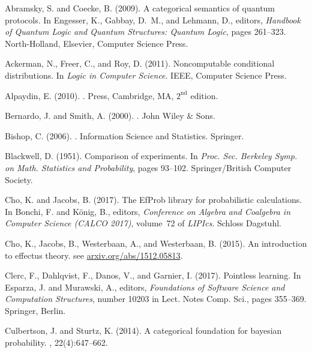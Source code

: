 \documentclass{mscs}
\begin{document}
\begin{thebibliography}{}

Abramsky, S. and Coecke, B. (2009).
\newblock A categorical semantics of quantum protocols.
\newblock In Engesser, K., Gabbay, D.~M., and Lehmann, D., editors, {\em
  Handbook of Quantum Logic and Quantum Structures: Quantum Logic}, pages
  261--323. North-Holland, Elsevier, Computer Science Press.

Ackerman, N., Freer, C., and Roy, D. (2011).
\newblock Noncomputable conditional distributions.
\newblock In {\em Logic in Computer Science}. IEEE, Computer Science Press.

Alpaydin, E. (2010).
.
 Press, Cambridge, MA, $2^{\textrm{nd}}$ edition.

Bernardo, J. and Smith, A. (2000).
.
\newblock John Wiley \& Sons.

Bishop, C. (2006).
.
\newblock Information Science and Statistics. Springer.

Blackwell, D. (1951).
\newblock Comparison of experiments.
\newblock In {\em Proc. Sec. Berkeley Symp. on Math. Statistics and
  Probability}, pages 93--102. Springer/British Computer Society.

Cho, K. and Jacobs, B. (2017).
\newblock The {EfProb} library for probabilistic calculations.
\newblock In Bonchi, F. and K{\"o}nig, B., editors, {\em Conference on Algebra
  and Coalgebra in Computer Science (CALCO 2017)}, volume~72 of {\em LIPIcs}.
  Schloss Dagstuhl.

Cho, K., Jacobs, B., Westerbaan, A., and Westerbaan, B. (2015).
\newblock An introduction to effectus theory.
\newblock see \url{arxiv.org/abs/1512.05813}.

Clerc, F., Dahlqvist, F., Danos, V., and Garnier, I. (2017).
\newblock Pointless learning.
\newblock In Esparza, J. and Murawski, A., editors, {\em Foundations of
  Software Science and Computation Structures}, number 10203 in Lect. Notes
  Comp. Sci., pages 355--369. Springer, Berlin.

Culbertson, J. and Sturtz, K. (2014).
\newblock A categorical foundation for bayesian probability.
, 22(4):647--662.


\end{thebibliography}
\end{document}
